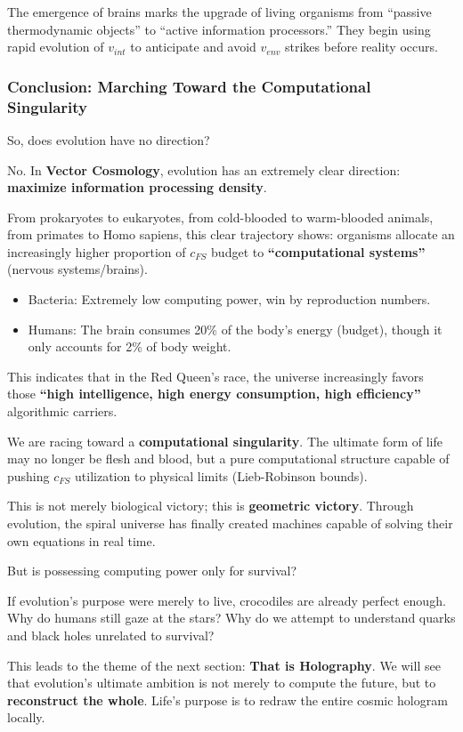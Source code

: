 The emergence of brains marks the upgrade of living organisms from ``passive thermodynamic objects'' to ``active information processors.'' They begin using rapid evolution of $v_{int}$ to anticipate and avoid $v_{env}$ strikes before reality occurs.

\subsubsection{Conclusion: Marching Toward the Computational Singularity}

So, does evolution have no direction?

No. In \textbf{Vector Cosmology}, evolution has an extremely clear direction: \textbf{maximize information processing density}.

From prokaryotes to eukaryotes, from cold-blooded to warm-blooded animals, from primates to Homo sapiens, this clear trajectory shows: organisms allocate an increasingly higher proportion of $c_{FS}$ budget to \textbf{``computational systems''} (nervous systems/brains).

\begin{itemize}
\item Bacteria: Extremely low computing power, win by reproduction numbers.

\item Humans: The brain consumes 20\% of the body's energy (budget), though it only accounts for 2\% of body weight.
\end{itemize}

This indicates that in the Red Queen's race, the universe increasingly favors those \textbf{``high intelligence, high energy consumption, high efficiency''} algorithmic carriers.

We are racing toward a \textbf{computational singularity}. The ultimate form of life may no longer be flesh and blood, but a pure computational structure capable of pushing $c_{FS}$ utilization to physical limits (Lieb-Robinson bounds).

This is not merely biological victory; this is \textbf{geometric victory}. Through evolution, the spiral universe has finally created machines capable of solving their own equations in real time.

But is possessing computing power only for survival?

If evolution's purpose were merely to live, crocodiles are already perfect enough. Why do humans still gaze at the stars? Why do we attempt to understand quarks and black holes unrelated to survival?

This leads to the theme of the next section: \textbf{That is Holography}. We will see that evolution's ultimate ambition is not merely to compute the future, but to \textbf{reconstruct the whole}. Life's purpose is to redraw the entire cosmic hologram locally.

